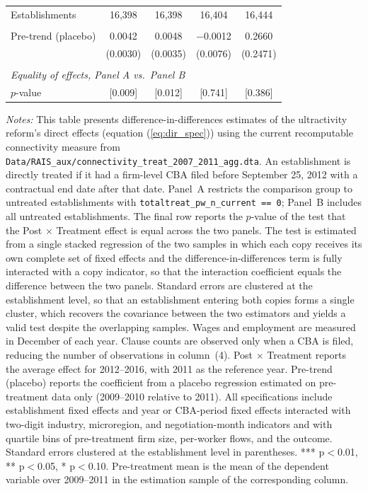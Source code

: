 \begin{table}[H]
\begin{tabular}{lcccc}
Establishments & 16{,}398 & 16{,}398 & 16{,}404 & 16{,}444\\
 &  &  &  & \\
Pre-trend (placebo) & 0.0042 & 0.0048 & $-$0.0012 & 0.2660\\
 & (0.0030) & (0.0035) & (0.0076) & (0.2471)\\
 &  &  &  & \\
\midrule
\multicolumn{5}{l}{\textit{Equality of effects, Panel A vs.\ Panel B}}\\
$p$-value & [0.009] & [0.012] & [0.741] & [0.386]\\
\bottomrule\bottomrule
\end{tabular}
\begin{minipage}{\linewidth}
    \scriptsize\vspace{4pt}
     \textit{Notes:} This table presents difference-in-differences estimates of the ultractivity reform's direct effects (equation (\ref{eq:dir_spec})) using the current recomputable connectivity measure from \texttt{Data/RAIS\_aux/connectivity\_treat\_2007\_2011\_agg.dta}. An establishment is directly treated if it had a firm-level CBA filed before September 25, 2012 with a contractual end date after that date. Panel~A restricts the comparison group to untreated establishments with \texttt{totaltreat\_pw\_n\_current == 0}; Panel~B includes all untreated establishments. The final row reports the $p$-value of the test that the Post $\times$ Treatment effect is equal across the two panels. The test is estimated from a single stacked regression of the two samples in which each copy receives its own complete set of fixed effects and the difference-in-differences term is fully interacted with a copy indicator, so that the interaction coefficient equals the difference between the two panels. Standard errors are clustered at the establishment level, so that an establishment entering both copies forms a single cluster, which recovers the covariance between the two estimators and yields a valid test despite the overlapping samples. Wages and employment are measured in December of each year. Clause counts are observed only when a CBA is filed, reducing the number of observations in column~(4). Post $\times$ Treatment reports the average effect for 2012--2016, with 2011 as the reference year. Pre-trend (placebo) reports the coefficient from a placebo regression estimated on pre-treatment data only (2009--2010 relative to 2011). All specifications include establishment fixed effects and year or CBA-period fixed effects interacted with two-digit industry, microregion, and negotiation-month indicators and with quartile bins of pre-treatment firm size, per-worker flows, and the outcome. Standard errors clustered at the establishment level in parentheses. *** p$<$0.01, ** p$<$0.05, * p$<$0.10. Pre-treatment mean is the mean of the dependent variable over 2009--2011 in the estimation sample of the corresponding column.
\end{minipage}
\end{table}
